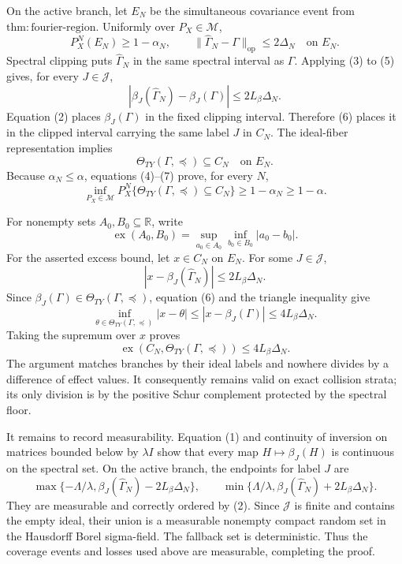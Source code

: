 On the active branch, let \(E_N\) be the simultaneous covariance event from \(\mathrm{thm:fourier\text{-}region}\).  Uniformly over \(P_X\in\mathcal M\),
\[
 P_X^N(E_N)\ge1-\alpha_N,
 \qquad
 \|\widehat\Gamma_N-\Gamma\|_{\mathrm{op}}\le2\Delta_N
 \quad\text{on }E_N. \tag{5}
\]
Spectral clipping puts \(\widehat\Gamma_N\) in the same spectral interval as \(\Gamma\).  Applying (3) to (5) gives, for every \(J\in\mathcal J\),
\[
 |\beta_J(\widehat\Gamma_N)-\beta_J(\Gamma)|
 \le2L_\beta\Delta_N. \tag{6}
\]
Equation (2) places \(\beta_J(\Gamma)\) in the fixed clipping interval.  Therefore (6) places it in the clipped interval carrying the same label \(J\) in \(C_N\).  The ideal-fiber representation implies
\[
 \Theta_{TY}(\Gamma,\preceq)\subseteq C_N
 \quad\text{on }E_N. \tag{7}
\]
Because \(\alpha_N\le\alpha\), equations (4)--(7) prove, for every \(N\),
\[
 \inf_{P_X\in\mathcal M}P_X^N
 \{\Theta_{TY}(\Gamma,\preceq)\subseteq C_N\}
 \ge1-\alpha_N\ge1-\alpha. \tag{8}
\]

For nonempty sets \(A_0,B_0\subseteq\mathbb R\), write
\[
 \operatorname{ex}(A_0,B_0)
 =\sup_{a_0\in A_0}\inf_{b_0\in B_0}|a_0-b_0|.
\]
For the asserted excess bound, let \(x\in C_N\) on \(E_N\).  For some \(J\in\mathcal J\),
\[
 |x-\beta_J(\widehat\Gamma_N)|\le2L_\beta\Delta_N.
\]
Since \(\beta_J(\Gamma)\in\Theta_{TY}(\Gamma,\preceq)\), equation (6) and the triangle inequality give
\[
 \inf_{\theta\in\Theta_{TY}(\Gamma,\preceq)}|x-\theta|
 \le |x-\beta_J(\Gamma)|\le4L_\beta\Delta_N.
\]
Taking the supremum over \(x\) proves
\[
 \operatorname{ex}(C_N,\Theta_{TY}(\Gamma,\preceq))
 \le4L_\beta\Delta_N. \tag{9}
\]
The argument matches branches by their ideal labels and nowhere divides by a difference of effect values.  It consequently remains valid on exact collision strata; its only division is by the positive Schur complement protected by the spectral floor.

It remains to record measurability.  Equation (1) and continuity of inversion on matrices bounded below by \(\lambda I\) show that every map \(H\mapsto\beta_J(H)\) is continuous on the spectral set.  On the active branch, the endpoints for label \(J\) are
\[
 \max\{-\Lambda/\lambda,\beta_J(\widehat\Gamma_N)-2L_\beta\Delta_N\},
 \qquad
 \min\{\Lambda/\lambda,\beta_J(\widehat\Gamma_N)+2L_\beta\Delta_N\}.
\]
They are measurable and correctly ordered by (2).  Since \(\mathcal J\) is finite and contains the empty ideal, their union is a measurable nonempty compact random set in the Hausdorff Borel sigma-field.  The fallback set is deterministic.  Thus the coverage events and losses used above are measurable, completing the proof.

